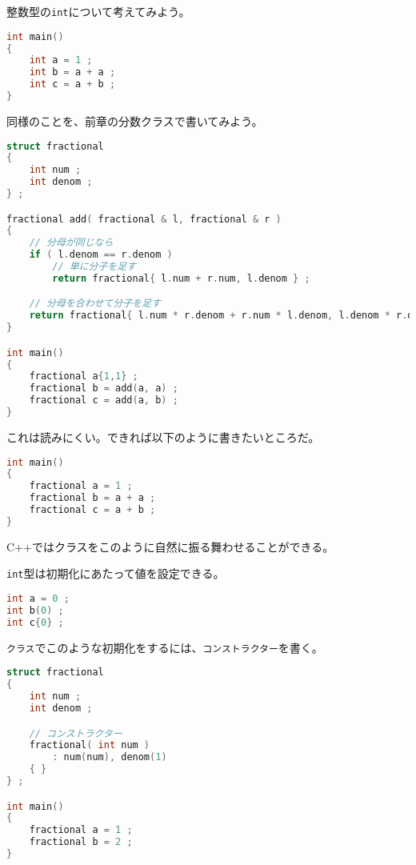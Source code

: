 
整数型の\texttt{int}について考えてみよう。

\begin{lstlisting}[language={C++}]
int main()
{
    int a = 1 ;
    int b = a + a ;
    int c = a + b ;
}
\end{lstlisting}

同様のことを、前章の分数クラスで書いてみよう。

\begin{lstlisting}[language={C++}]
struct fractional
{
    int num ;
    int denom ;
} ;

fractional add( fractional & l, fractional & r )
{
    // 分母が同じなら
    if ( l.denom == r.denom )
        // 単に分子を足す
        return fractional{ l.num + r.num, l.denom } ;

    // 分母を合わせて分子を足す
    return fractional{ l.num * r.denom + r.num * l.denom, l.denom * r.denom } ;
}

int main()
{
    fractional a{1,1} ;
    fractional b = add(a, a) ;
    fractional c = add(a, b) ;
}
\end{lstlisting}

これは読みにくい。できれば以下のように書きたいところだ。

\begin{lstlisting}[language={C++}]
int main()
{
    fractional a = 1 ;
    fractional b = a + a ;
    fractional c = a + b ;
}
\end{lstlisting}

C++ではクラスをこのように自然に振る舞わせることができる。


\texttt{int}型は初期化にあたって値を設定できる。

\begin{lstlisting}[language={C++}]
int a = 0 ;
int b(0) ;
int c{0} ;
\end{lstlisting}

\texttt{クラス}でこのような初期化をするには、\texttt{コンストラクター}を書く。

\begin{lstlisting}[language={C++}]
struct fractional
{
    int num ;
    int denom ;

    // コンストラクター
    fractional( int num )
        : num(num), denom(1)
    { }
} ;

int main()
{
    fractional a = 1 ;
    fractional b = 2 ;
}
\end{lstlisting}

